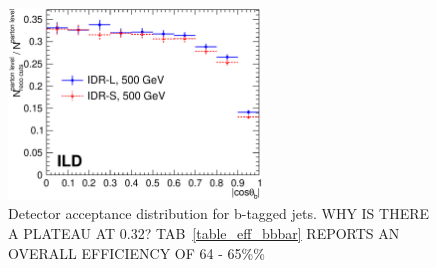 \documentclass[preprint]{elsarticle}
\begin{document}
\begin{figure}[h!]
\centering
  \includegraphics[width=0.6\textwidth]{figures_BBbar/acceptance_2models_v2.eps} 
\caption{Detector acceptance distribution for b-tagged jets. WHY IS THERE A PLATEAU AT 0.32? TAB~\ref{table_eff_bbbar} REPORTS AN OVERALL EFFICIENCY OF 64 - 65\%\% }
\label{fig_acceptance_bb}
\end{figure}
\end{document}
